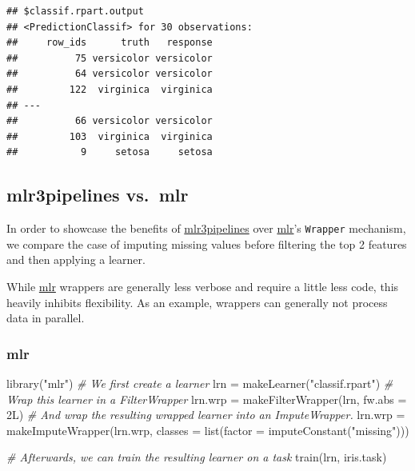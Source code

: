\documentclass[
]{scrbook}
\newenvironment{Shaded}{\begin{snugshade}}{\end{snugshade}}
\newcommand{\AttributeTok}[1]{\textcolor[rgb]{0.77,0.63,0.00}{#1}}
\newcommand{\CommentTok}[1]{\textcolor[rgb]{0.56,0.35,0.01}{\textit{#1}}}
\newcommand{\FunctionTok}[1]{\textcolor[rgb]{0.00,0.00,0.00}{#1}}
\newcommand{\NormalTok}[1]{#1}
\newcommand{\OtherTok}[1]{\textcolor[rgb]{0.56,0.35,0.01}{#1}}
\newcommand{\StringTok}[1]{\textcolor[rgb]{0.31,0.60,0.02}{#1}}
\renewenvironment{Shaded} {\begin{snugshade}\small} {\end{snugshade}}
\begin{document}
\begin{verbatim}
## $classif.rpart.output
## <PredictionClassif> for 30 observations:
##     row_ids      truth   response
##          75 versicolor versicolor
##          64 versicolor versicolor
##         122  virginica  virginica
## ---                              
##          66 versicolor versicolor
##         103  virginica  virginica
##           9     setosa     setosa
\end{verbatim}

\hypertarget{mlr3pipelines-vs.-mlr}{%
\subsection{mlr3pipelines vs.~mlr}\label{mlr3pipelines-vs.-mlr}}

In order to showcase the benefits of \href{https://cran.r-project.org/package=mlr3pipelines}{mlr3pipelines} over \href{https://cran.r-project.org/package=mlr}{mlr}'s \texttt{Wrapper} mechanism, we compare the case of imputing missing values before filtering the top 2 features and then applying a learner.

While \href{https://cran.r-project.org/package=mlr}{mlr} wrappers are generally less verbose and require a little less code, this heavily inhibits flexibility.
As an example, wrappers can generally not process data in parallel.

\hypertarget{mlr}{%
\subsubsection{mlr}\label{mlr}}

\begin{Shaded}
\begin{Highlighting}[]
\FunctionTok{library}\NormalTok{(}\StringTok{"mlr"}\NormalTok{)}
\CommentTok{\# We first create a learner}
\NormalTok{lrn }\OtherTok{=} \FunctionTok{makeLearner}\NormalTok{(}\StringTok{"classif.rpart"}\NormalTok{)}
\CommentTok{\# Wrap this learner in a FilterWrapper}
\NormalTok{lrn.wrp }\OtherTok{=} \FunctionTok{makeFilterWrapper}\NormalTok{(lrn, }\AttributeTok{fw.abs =}\NormalTok{ 2L)}
\CommentTok{\# And wrap the resulting wrapped learner into an ImputeWrapper.}
\NormalTok{lrn.wrp }\OtherTok{=} \FunctionTok{makeImputeWrapper}\NormalTok{(lrn.wrp, }\AttributeTok{classes =} \FunctionTok{list}\NormalTok{(}\AttributeTok{factor =} \FunctionTok{imputeConstant}\NormalTok{(}\StringTok{"missing"}\NormalTok{)))}

\CommentTok{\# Afterwards, we can train the resulting learner on a task}
\FunctionTok{train}\NormalTok{(lrn, iris.task)}
\end{Highlighting}
\end{Shaded}
\end{document}
